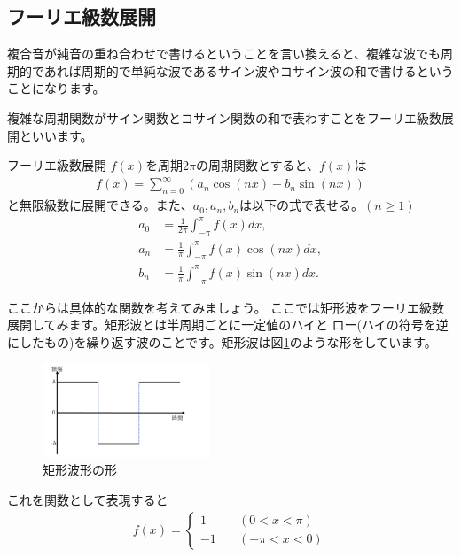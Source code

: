 \documentclass[11pt,b5paper,papersize,dvipdfmx]{jsbook}
\begin{document}
%
\newpage
\subsection{フーリエ級数展開}
複合音が純音の重ね合わせで書けるということを言い換えると、複雑な波でも周期的であれば周期的で単純な波であるサイン波やコサイン波の和で書けるということになります。\par
複雑な周期関数がサイン関数とコサイン関数の和で表わすことをフーリエ級数展開といいます。

\begin{itembox}[l]{フーリエ級数展開}
  $f(x)$を周期$2\pi$の周期関数とすると、$f(x)$は
  \begin{align}
    f(x) =\sum_{n=0}^{\infty}(a_n \cos(nx)+b_n \sin(nx))
  \end{align}
    と無限級数に展開できる。また、$a_0,a_n,b_n$は以下の式で表せる。$(n\geq1)$
  \begin{align}
    a_0 &= \frac{1}{2\pi}\int_{-\pi}^{\pi} f(x) dx,\\
    a_n &= \frac{1}{\pi}\int_{-\pi}^{\pi} f(x) \cos(nx) dx,\\
    b_n &= \frac{1}{\pi}\int_{-\pi}^{\pi} f(x) \sin(nx) dx.
  \end{align}
\end{itembox}

ここからは具体的な関数を考えてみましょう。
ここでは矩形波をフーリエ級数展開してみます。矩形波とは半周期ごとに一定値のハイと
ロー(ハイの符号を逆にしたもの)を繰り返す波のことです。矩形波は図\ref{fig:kukeihae}のような形をしています。
\begin{figure}[H]
  \centering
  \includegraphics[width=5cm]{nsmr/img/slide5.png}
  \caption{矩形波形の形}
  \label{fig:kukeihae}
\end{figure}
これを関数として表現すると
\begin{align}
  f(x)=
    \begin{cases}
      1 &\quad (0<x<\pi)\\
      -1 &\quad (-\pi<x<0)
    \end{cases}
\end{align}
\end{document}
